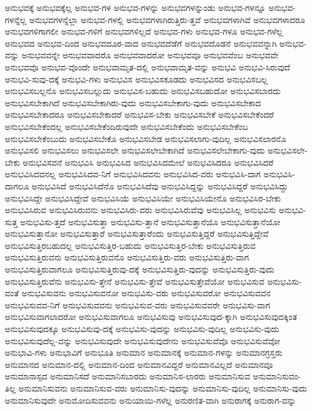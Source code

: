 {ಅನುಭವಕ್ಕೆ
ಅನುಭವಕ್ಕೆಲ್ಲ
ಅನುಭವ-ಗಳ
ಅನುಭವ-ಗಳನ್ನು
ಅನುಭವಗಳನ್ನುಂಡು
ಅನುಭವ-ಗಳನ್ನೂ
ಅನುಭವ-ಗಳನ್ನೆಲ್ಲ
ಅನುಭವಗಳನ್ನೆಲ್ಲಾ
ಅನುಭವ-ಗಳಲ್ಲಿ
ಅನುಭವಗಳಾಗಿರುತ್ತಿರು-ತ್ತವೆ
ಅನುಭವಗಳಾಗಿವೆ
ಅನುಭವಗಳಾದರೂ
ಅನುಭವಗಳಿಗಾಗಲೀ
ಅನುಭವ-ಗಳಿಗೆ
ಅನುಭವಗಳಿಲ್ಲದೆ
ಅನುಭವ-ಗಳು
ಅನುಭವ-ಗಳೂ
ಅನುಭವ-ಗಳೆಲ್ಲ
ಅನುಭವದ
ಅನುಭವ-ದಿಂದ
ಅನುಭವದೂರ-ವಾದ
ಅನುಭವದೆಡೆಗೆ
ಅನುಭವದೊಡನೆ
ಅನುಭವವನ್ನಾಗಿ
ಅನುಭವ-ವನ್ನು
ಅನುಭವವನ್ನೇ
ಅನುಭವವಾದರೊ
ಅನುಭವವಾದರೋ
ಅನುಭವವೂ
ಅನುಭವವೆಂಬ
ಅನುಭವವೇ
ಅನುಭವವೊ
ಅನುಭವ-ವೊಂದೇ
ಅನುಭವಾಮೃತ-ದಲ್ಲಿ
ಅನುಭವಾಮೃತ-ವನ್ನು
ಅನುಭವಿ
ಅನುಭವಿ-ಸಿರುವುದೆ
ಅನುಭವಿ-ಸುವು-ದಕ್ಕೆ
ಅನುಭವಿ-ಗಳು
ಅನುಭವಿಸ
ಅನುಭವಿಸಕೂಡದು
ಅನುಭವಿಸದ
ಅನುಭವಿಸಬಲ್ಲ
ಅನುಭವಿಸಬಲ್ಲನೊ
ಅನುಭವಿಸಬಲ್ಲುದು
ಅನುಭವಿಸ-ಬಹುದು
ಅನುಭವಿಸಬಹುದೋ
ಅನುಭವಿಸಬಾರದು
ಅನುಭವಿಸಬೇಕಾಗಿದೆ
ಅನುಭವಿಸಬೇಕಾಗಿರು-ವುದು
ಅನುಭವಿಸಬೇಕಾಗು-ವುದು
ಅನುಭವಿಸಬೇಕಾದ
ಅನುಭವಿಸಬೇಕಾದರೂ
ಅನುಭವಿಸಬೇಕಾದರೆ
ಅನುಭವಿಸ-ಬೇಕು
ಅನುಭವಿಸಬೇಕೆ
ಅನುಭವಿಸಬೇಕೆಂದರೆ
ಅನುಭವಿಸಬೇಕೆಂದಲ್ಲ
ಅನುಭವಿಸಬೇಕೆಂದಿರುವುದೇ
ಅನುಭವಿಸಬೇಕೆಂದು
ಅನುಭವಿಸಬೇಕೆಂಬ
ಅನುಭವಿಸಬೇಕೆಂಬುದು
ಅನುಭವಿಸಬೇಕೊ
ಅನುಭವಿಸಬೇಡ
ಅನುಭವಿಸಲಾಗು-ವುದಿಲ್ಲ
ಅನುಭವಿಸಲಾರನೊ
ಅನುಭವಿಸಲಿ
ಅನುಭವಿಸಲು
ಅನುಭವಿಸಲೇ
ಅನುಭವಿಸಲೇಬೇಕಾಗಿದೆ
ಅನುಭವಿಸಲೇಬೇಕಾಗು-ವುದು
ಅನುಭವಿಸಲೇ-ಬೇಕು
ಅನುಭವಿಸವನೆ
ಅನುಭವಿಸಿ
ಅನುಭವಿಸಿದ
ಅನುಭವಿಸಿದಮೇಲೆ
ಅನುಭವಿಸಿದರೂ
ಅನುಭವಿಸಿದರೆ
ಅನುಭವಿಸಿದವನಲ್ಲ
ಅನುಭವಿಸಿದವ-ನಿಗೆ
ಅನುಭವಿಸಿದವನು
ಅನುಭವಿಸಿದ-ವರು
ಅನುಭವಿಸಿ-ದಾಗ
ಅನುಭವಿಸಿ-ದಾಗಲೂ
ಅನುಭವಿಸಿದೆ
ಅನುಭವಿಸಿದೆನೊ
ಅನುಭವಿಸಿದೆವು
ಅನುಭವಿಸಿದ್ದನ್ನು
ಅನುಭವಿಸಿದ್ದರೆ
ಅನುಭವಿಸಿದ್ದು
ಅನುಭವಿಸಿದ್ದೇ
ಅನುಭವಿಸಿದ್ದೇವೆ
ಅನುಭವಿಸಿಯೆ
ಅನುಭವಿಸಿಯೇ
ಅನುಭವಿಸಿಯೇನೊ
ಅನುಭವಿಸಿರ-ಬೇಕು
ಅನುಭವಿಸಿರುವ
ಅನುಭವಿಸಿರುವನು
ಅನುಭವಿಸಿರು-ವರು
ಅನುಭವಿಸಿರುವೆವು
ಅನುಭವಿಸಿಲ್ಲ
ಅನುಭವಿಸು
ಅನುಭವಿ-ಸುತ್ತ
ಅನುಭವಿಸು-ತ್ತದೆ
ಅನುಭವಿಸುತ್ತಾ
ಅನುಭವಿಸು-ತ್ತಾನೆ
ಅನುಭವಿಸುತ್ತಾನೆಯೊ
ಅನುಭವಿಸುತ್ತಾನೆಯೋ
ಅನುಭವಿಸುತ್ತಾನೋ
ಅನುಭವಿಸುತ್ತಾರೆ
ಅನುಭವಿಸುತ್ತಾರೆಂದು
ಅನುಭವಿಸುತ್ತಿದ್ದರೆ
ಅನುಭವಿಸುತ್ತಿದ್ದೇವೆ
ಅನುಭವಿಸುತ್ತಿರಬಹುದಲ್ಲ
ಅನುಭವಿಸುತ್ತಿರ-ಬಹುದು
ಅನುಭವಿಸುತ್ತಿರ-ಬೇಕು
ಅನುಭವಿಸುತ್ತಿರುವ
ಅನುಭವಿಸುತ್ತಿರುವನು
ಅನುಭವಿಸುತ್ತಿರುವನೊ
ಅನುಭವಿಸುತ್ತಿರು-ವರು
ಅನುಭವಿಸುತ್ತಿರು-ವಾಗ
ಅನುಭವಿಸುತ್ತಿರುವಾಗಲೂ
ಅನುಭವಿಸುತ್ತಿರುವು-ದಕ್ಕೆ
ಅನುಭವಿಸುತ್ತಿರು-ವುದನ್ನು
ಅನುಭವಿಸುತ್ತಿರು-ವುದು
ಅನುಭವಿಸುತ್ತಿರುವೆನು
ಅನುಭವಿಸು-ತ್ತೇನೆ
ಅನುಭವಿಸು-ತ್ತೇವೆ
ಅನುಭವಿಸುತ್ತೇವೆಯೋ
ಅನುಭವಿಸುವ
ಅನುಭವಿಸು-ವಂತೆ
ಅನುಭವಿಸುವನು
ಅನುಭವಿಸುವನೋ
ಅನುಭವಿಸು-ವರು
ಅನುಭವಿಸುವರೋ
ಅನುಭವಿಸುವವನ
ಅನುಭವಿಸುವವ-ನಿಗೆ
ಅನುಭವಿಸುವವನು
ಅನುಭವಿಸುವ-ವರು
ಅನುಭವಿಸುವವರೇ
ಅನುಭವಿಸು-ವಾಗ
ಅನುಭವಿಸುವಾಗಲಾದರೋ
ಅನುಭವಿಸುವಾಗಲೂ
ಅನುಭವಿಸುವು
ಅನುಭವಿಸುವುದ-ಕ್ಕಾಗಿ
ಅನುಭವಿಸುವುದಕ್ಕಿಂತ
ಅನುಭವಿಸುವುದಕ್ಕೂ
ಅನುಭವಿಸುವು-ದಕ್ಕೆ
ಅನುಭವಿಸು-ವುದನ್ನು
ಅನುಭವಿಸು-ವುದಿಲ್ಲ
ಅನುಭವಿಸು-ವುದು
ಅನುಭವಿಸುವುದೆಲ್ಲ-ವನ್ನು
ಅನುಭವಿಸುವುದೇ
ಅನುಭವಿಸುವುದೇನು
ಅನುಭವಿಸುವೆವೊ
ಅನುಭವಿಸುವೆವೋ
ಅನುಭಾವಿ-ಗಳು
ಅನುಭಾವಿಗೆ
ಅನುಭೂತಿ
ಅನುಮಾನ
ಅನುಮಾನಕ್ಕೆ
ಅನುಮಾನ-ಗಳನ್ನು
ಅನುಮಾನಗ್ರಸ್ತರು
ಅನುಮಾನದ
ಅನುಮಾನ-ದಲ್ಲಿ
ಅನುಮಾನ-ದಿಂದ
ಅನುಮಾನವಿದ್ದರೆ
ಅನುಮಾನವಿಲ್ಲದೆ
ಅನುಮಾನವೂ
ಅನುಮಾನಾಸ್ಪದ
ಅನುಮಾನಿಸದೆ
ಅನುಮಾನಿಸಬಾರದು
ಅನುಮಾನಿಸ-ಲಾರರು
ಅನುಮಾನಿಸುವ
ಅನುಮಾನಿಸುವಂ-ತಿಲ್ಲ
ಅನುಮಾನಿಸುವನು
ಅನುಮಾನಿಸುವ-ವರು
ಅನುಮಾನಿಸು-ವುದನ್ನು
ಅನುಮಾನಿಸು-ವುದಿಲ್ಲ
ಅನುಮಾನಿಸು-ವುದು
ಅನುಮಾನಿಸುವುದೇ
ಅನುಮೋದಿಸುವವನು
ಅನುಯಾಯಿ-ಗಳೆಲ್ಲ
ಅನುರಣಿತ-ವಾಗಿ
ಅನುರಾಗಕ್ಕೆ
ಅನುರಾಗ-ವನ್ನು
}
